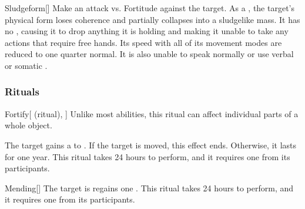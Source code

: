 \lowercase{\hypertarget{spell:Sludgeform}{}}\label{spell:Sludgeform}
\begin{freeability}[Rank 8]{\hypertarget{spell:Sludgeform}{Sludgeform}}[]
Make an attack vs. Fortitude against the target.
\hit As a , the target's physical form loses coherence and partially collapses into a sludgelike mass.
It has no , causing it to drop anything it is holding and making it unable to take any actions that require free hands.
Its speed with all of its  movement modes are reduced to one quarter normal.
It is also unable to speak normally or use verbal or somatic .

\end{freeability}
\vspace{0.25em}



\subsubsection{Rituals}


\lowercase{\hypertarget{spell:Fortify}{}}\label{spell:Fortify}
\begin{attuneability}[Rank 1]{\hypertarget{spell:Fortify}{Fortify}}[ (ritual), ]
Unlike most abilities, this ritual can affect individual parts of a whole object.

The target gains a   to .
If the target is moved, this effect ends.
Otherwise, it lasts for one year.
This ritual takes 24 hours to perform, and it requires one  from its participants.
\end{attuneability}
\vspace{0.25em}



\lowercase{\hypertarget{spell:Mending}{}}\label{spell:Mending}
\begin{freeability}[Rank 1]{\hypertarget{spell:Mending}{Mending}}[]
The target is regains one .
This ritual takes 24 hours to perform, and it requires one  from its participants.
\end{freeability}
\vspace{0.25em}



